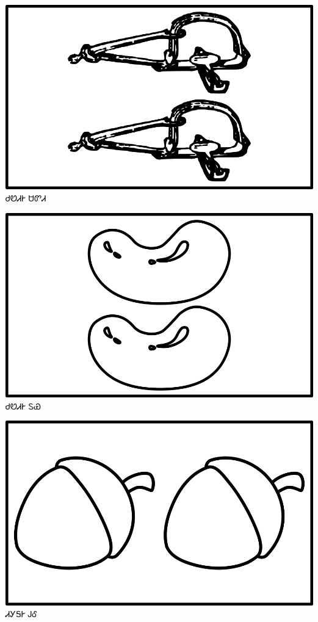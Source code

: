 \documentclass[avery5371]{flashcards}%
\begin{document}
\begin{flashcard}{
\includegraphics[width=0.95\columnwidth,height=.51\columnwidth,keepaspectratio]{../artwork/objects-neutral/tali-sadvdi}
}\Huge ᏧᏬᏗᎨ ᏌᏛᏗ
\end{flashcard}

\begin{flashcard}{
\includegraphics[width=0.95\columnwidth,height=.51\columnwidth,keepaspectratio]{../artwork/objects-neutral/tali-tuya}
}\Huge ᏧᏬᏗᎨ ᏚᏯ
\end{flashcard}

\begin{flashcard}{
\includegraphics[width=0.95\columnwidth,height=.51\columnwidth,keepaspectratio]{../artwork/objects-neutral/tali-gule}
}\Huge ᏗᎩᎦᎨ ᎫᎴ
\end{flashcard}
\end{document}
